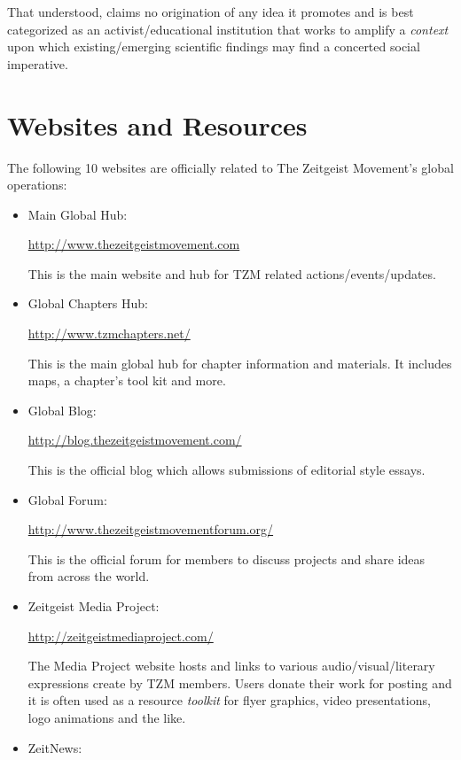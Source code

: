 \documentclass[10pt, a4paper, cleardoubleempty, openright, twoside]{book}
\begin{document}
That understood,  claims no
origination of any idea it promotes and is best categorized as an
activist/educational institution that works to amplify a \emph{context}
upon which existing/emerging scientific findings may find a concerted
social imperative.


\section* {Websites and Resources}
The following 10 websites are officially related to The Zeitgeist
Movement's global operations:

\begin{itemize}
	\item Main Global Hub:

	\url{http://www.thezeitgeistmovement.com}

	This is the main website and hub for TZM related
	actions/events/updates.

	\item Global Chapters Hub:
	
	\url{http://www.tzmchapters.net/}
	
	This is the main global hub for chapter information and materials. It
	includes maps, a chapter's tool kit and more.

	\item Global Blog:

	\url{http://blog.thezeitgeistmovement.com/}
	
	This is the official blog which allows submissions of editorial style
	essays.

	\item Global Forum:
	
	\url{http://www.thezeitgeistmovementforum.org/}
	
	This is the official forum for members to discuss projects and share
	ideas from across the world.

	\item Zeitgeist Media Project:
	
	\url{http://zeitgeistmediaproject.com/}
	
	The Media Project website hosts and links to various
	audio/visual/literary expressions create by TZM members. Users donate
	their work for posting and it is often used as a resource
	\emph{toolkit} for flyer graphics, video presentations, logo
	animations and the like.
	
	\item ZeitNews:
	

\end{itemize}
\end{document}
